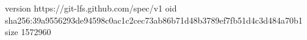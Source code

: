 version https://git-lfs.github.com/spec/v1
oid sha256:39a9556293de94598c0ac1c2cec73ab86b71d48b3789ef7fb51d4c3d484a70b1
size 1572960
